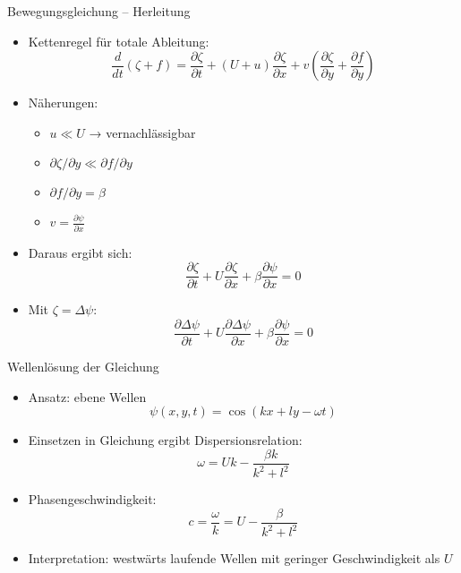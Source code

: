\begin{frame}{Bewegungsgleichung – Herleitung}
	\begin{itemize}
		\item Kettenregel für totale Ableitung:
		      \[
			      \frac{d}{dt} (\zeta + f)
			      =
			      \frac{\partial \zeta}{\partial t}
			      + (U+u) \frac{\partial \zeta}{\partial x}
			      + v \left( \frac{\partial \zeta}{\partial y} + \frac{\partial f}{\partial y} \right)
		      \]
		\item Näherungen:
		      \begin{itemize}
			      \item \( u \ll U \) → vernachlässigbar
			      \item \( \partial \zeta / \partial y \ll \partial f / \partial y \)
			      \item \( \partial f / \partial y = \beta \)
			      \item \( v = \frac{\partial \psi}{\partial x} \)
		      \end{itemize}
		\item Daraus ergibt sich:
		      \[
			      \frac{\partial \zeta}{\partial t}
			      + U \frac{\partial \zeta}{\partial x}
			      + \beta \frac{\partial \psi}{\partial x} = 0
		      \]
		\item Mit \( \zeta = \Delta \psi \):
		      \[
			      \frac{\partial \Delta \psi}{\partial t}
			      + U \frac{\partial \Delta \psi}{\partial x}
			      + \beta \frac{\partial \psi}{\partial x} = 0
		      \]
	\end{itemize}
\end{frame}

\begin{frame}{Wellenlösung der Gleichung}
	\begin{itemize}
		\item Ansatz: ebene Wellen
		      \[
			      \psi(x, y, t) = \cos(kx + ly - \omega t)
		      \]
		\item Einsetzen in Gleichung ergibt Dispersionsrelation:
		      \[
			      \omega = Uk - \frac{\beta k}{k^2 + l^2}
		      \]
		\item Phasengeschwindigkeit:
		      \[
			      c = \frac{\omega}{k} = U - \frac{\beta}{k^2 + l^2}
		      \]
		\item Interpretation: westwärts laufende Wellen mit geringer Geschwindigkeit als \( U \)
	\end{itemize}
\end{frame}

